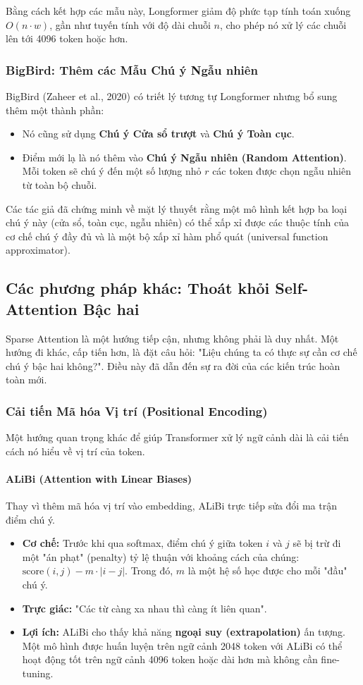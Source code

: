 Bằng cách kết hợp các mẫu này, Longformer giảm độ phức tạp tính toán xuống $O(n \cdot w)$, gần như tuyến tính với độ dài chuỗi $n$, cho phép nó xử lý các chuỗi lên tới 4096 token hoặc hơn.

\subsubsection{BigBird: Thêm các Mẫu Chú ý Ngẫu nhiên}
BigBird (Zaheer et al., 2020) \cite{zaheer2020big} có triết lý tương tự Longformer nhưng bổ sung thêm một thành phần:
\begin{itemize}
    \item Nó cũng sử dụng \textbf{Chú ý Cửa sổ trượt} và \textbf{Chú ý Toàn cục}.
    \item Điểm mới lạ là nó thêm vào \textbf{Chú ý Ngẫu nhiên (Random Attention)}. Mỗi token sẽ chú ý đến một số lượng nhỏ $r$ các token được chọn ngẫu nhiên từ toàn bộ chuỗi.
\end{itemize}
Các tác giả đã chứng minh về mặt lý thuyết rằng một mô hình kết hợp ba loại chú ý này (cửa sổ, toàn cục, ngẫu nhiên) có thể xấp xỉ được các thuộc tính của cơ chế chú ý đầy đủ và là một bộ xấp xỉ hàm phổ quát (universal function approximator).

\subsection{Các phương pháp khác: Thoát khỏi Self-Attention Bậc hai}
\label{ssec:other_long_context_methods}

Sparse Attention là một hướng tiếp cận, nhưng không phải là duy nhất. Một hướng đi khác, cấp tiến hơn, là đặt câu hỏi: "Liệu chúng ta có thực sự cần cơ chế chú ý bậc hai không?". Điều này đã dẫn đến sự ra đời của các kiến trúc hoàn toàn mới.
\subsubsection{Cải tiến Mã hóa Vị trí (Positional Encoding)}
Một hướng quan trọng khác để giúp Transformer xử lý ngữ cảnh dài là cải tiến cách nó hiểu về vị trí của token.
\paragraph{ALiBi (Attention with Linear Biases)}
Thay vì thêm mã hóa vị trí vào embedding, ALiBi \cite{press2021train} trực tiếp sửa đổi ma trận điểm chú ý.
\begin{itemize}
    \item \textbf{Cơ chế:} Trước khi qua softmax, điểm chú ý giữa token $i$ và $j$ sẽ bị trừ đi một "án phạt" (penalty) tỷ lệ thuận với khoảng cách của chúng: $\text{score}(i, j) - m \cdot |i - j|$. Trong đó, $m$ là một hệ số học được cho mỗi "đầu" chú ý.
    \item \textbf{Trực giác:} "Các từ càng xa nhau thì càng ít liên quan".
    \item \textbf{Lợi ích:} ALiBi cho thấy khả năng \textbf{ngoại suy (extrapolation)} ấn tượng. Một mô hình được huấn luyện trên ngữ cảnh 2048 token với ALiBi có thể hoạt động tốt trên ngữ cảnh 4096 token hoặc dài hơn mà không cần fine-tuning.
\end{itemize}

